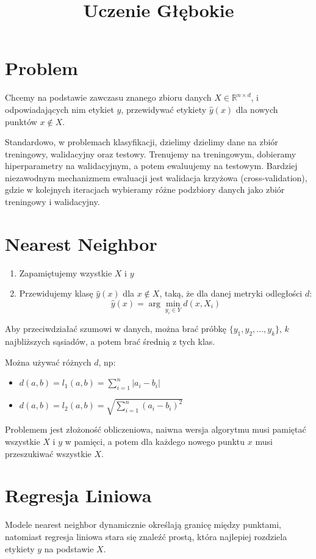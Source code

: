 \documentclass{../notatki}
\title{Uczenie Głębokie}
\begin{document}
\section{Problem}

Chcemy na podstawie zawczasu znanego zbioru danych $X \in
\mathbb{R}^{n \times d}$, i odpowiadających
nim etykiet $y$, przewidywać etykiety $\hat{y}(x)$ dla nowych punktów
$x \notin X$.

Standardowo, w problemach klasyfikacji, dzielimy dzielimy dane na zbiór
treningowy, walidacyjny oraz testowy. Trenujemy na treningowym, dobieramy
hiperparametry na walidacyjnym, a potem ewaluujemy na testowym. Bardziej
niezawodnym mechanizmem ewaluacji jest walidacja krzyżowa
(cross-validation), gdzie w kolejnych iteracjach wybieramy różne
podzbiory danych jako zbiór treningowy i walidacyjny.

\section{Nearest Neighbor}

\begin{enumerate}
  \item Zapamiętujemy wzystkie $X$ i $y$
  \item Przewidujemy klasę $\hat{y}(x)$ dla $x \notin X$, taką, że dla danej
    metryki odległości $d$:
    $$
    \hat{y}(x) = \arg\min_{y_i \in Y} d(x, X_i)
    $$
\end{enumerate}

Aby przeciwdziałać szumowi w danych, można brać próbkę $\{y_1, y_2,
\dots, y_k\}$, $k$ najbliższych sąsiadów, a potem brać średnią z tych klas.

Można używać różnych $d$, np:
\begin{itemize}
  \item $d(a, b) = l_1(a, b) = \sum_{i=1}^n |a_i - b_i|$
  \item $d(a, b) = l_2(a, b) = \sqrt{\sum_{i=1}^n (a_i - b_i)^2}$
\end{itemize}

Problemem jest złożoność obliczeniowa, naiwna wersja algorytmu musi pamiętać
wszystkie $X$ i $y$ w pamięci, a potem dla każdego nowego punktu $x$ musi
przeszukiwać wszystkie $X$.

\section{Regresja Liniowa}

Modele nearest neighbor dynamicznie określają granicę między punktami,
natomiast regresja liniowa stara się znaleźć prostą, która najlepiej
rozdziela etykiety $y$ na podstawie $X$.
\end{document}
